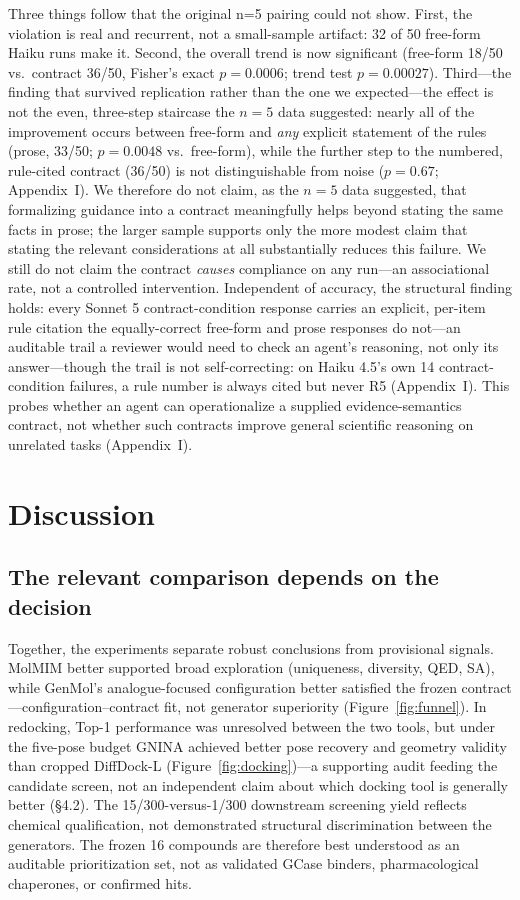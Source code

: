 \documentclass{article}
\begin{document}
Three things follow that the original n=5 pairing could not show. First, the violation is real and recurrent, not a small-sample artifact: 32 of 50 free-form Haiku runs make it. Second, the overall trend is now significant (free-form 18/50 vs.\ contract 36/50, Fisher's exact $p=0.0006$; trend test $p=0.00027$). Third---the finding that survived replication rather than the one we expected---the effect is not the even, three-step staircase the $n=5$ data suggested: nearly all of the improvement occurs between free-form and \emph{any} explicit statement of the rules (prose, 33/50; $p=0.0048$ vs.\ free-form), while the further step to the numbered, rule-cited contract (36/50) is not distinguishable from noise ($p=0.67$; Appendix~I). We therefore do not claim, as the $n=5$ data suggested, that formalizing guidance into a contract meaningfully helps beyond stating the same facts in prose; the larger sample supports only the more modest claim that stating the relevant considerations at all substantially reduces this failure. We still do not claim the contract \emph{causes} compliance on any run---an associational rate, not a controlled intervention. Independent of accuracy, the structural finding holds: every Sonnet 5 contract-condition response carries an explicit, per-item rule citation the equally-correct free-form and prose responses do not---an auditable trail a reviewer would need to check an agent's reasoning, not only its answer---though the trail is not self-correcting: on Haiku 4.5's own 14 contract-condition failures, a rule number is always cited but never R5 (Appendix~I). This probes whether an agent can operationalize a supplied evidence-semantics contract, not whether such contracts improve general scientific reasoning on unrelated tasks (Appendix~I).

\section{Discussion}

\subsection{The relevant comparison depends on the decision}

Together, the experiments separate robust conclusions from provisional signals. MolMIM better supported broad exploration (uniqueness, diversity, QED, SA), while GenMol's analogue-focused configuration better satisfied the frozen contract---configuration--contract fit, not generator superiority (Figure~\ref{fig:funnel}). In redocking, Top-1 performance was unresolved between the two tools, but under the five-pose budget GNINA achieved better pose recovery and geometry validity than cropped DiffDock-L (Figure~\ref{fig:docking})---a supporting audit feeding the candidate screen, not an independent claim about which docking tool is generally better (\S4.2). The 15/300-versus-1/300 downstream screening yield reflects chemical qualification, not demonstrated structural discrimination between the generators. The frozen 16 compounds are therefore best understood as an auditable prioritization set, not as validated GCase binders, pharmacological chaperones, or confirmed hits.
\end{document}
